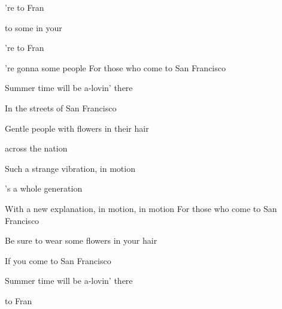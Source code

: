 


\zs
{}'re  to  Fran

 to  some  in your 

're  to  Fran

're gonna  some  people 
\ks
\zs
For those who come to San Francisco

Summer time will be a-lovin' there

In the streets of San Francisco

Gentle people with flowers in their hair
\ks

\zr
{} across the nation

Such a strange vibration,  in motion

's a whole generation

With a new explanation,  in motion,  in motion
\kr
\zs
For those who come to San Francisco

Be sure to wear some flowers in your hair

If you come to San Francisco

Summer time will be a-lovin' there
\ks

\zs
{}   to  Fran

  
\ks
\kp


